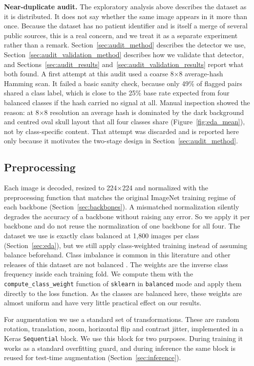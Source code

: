 \documentclass[11pt]{article}
\begin{document}
\textbf{Near-duplicate audit.} The exploratory analysis above describes the dataset as it is distributed. It does not say whether the same image appears in it more than once. Because the dataset has no patient identifier and is itself a merge of several public sources, this is a real concern, and we treat it as a separate experiment rather than a remark. Section~\ref{sec:audit_method} describes the detector we use, Section~\ref{sec:audit_validation_method} describes how we validate that detector, and Sections~\ref{sec:audit_results} and~\ref{sec:audit_validation_results} report what both found. A first attempt at this audit used a coarse 8$\times$8 average-hash Hamming scan. It failed a basic sanity check, because only 49\% of flagged pairs shared a class label, which is close to the 25\% base rate expected from four balanced classes if the hash carried no signal at all. Manual inspection showed the reason: at 8$\times$8 resolution an average hash is dominated by the dark background and centred oval skull layout that all four classes share (Figure~\ref{fig:eda_mean}), not by class-specific content. That attempt was discarded and is reported here only because it motivates the two-stage design in Section~\ref{sec:audit_method}.

\subsection{Preprocessing}
\label{sec:preprocessing}
Each image is decoded, resized to 224$\times$224 and normalized with the preprocessing function that matches the original ImageNet training regime of each backbone (Section~\ref{sec:backbones}). A mismatched normalization silently degrades the accuracy of a backbone without raising any error. So we apply it per backbone and do not reuse the normalization of one backbone for all four. The dataset we use is exactly class balanced at 1,800 images per class (Section~\ref{sec:eda}), but we still apply class-weighted training instead of assuming balance beforehand. Class imbalance is common in this literature and other releases of this dataset are not balanced \cite{buda2018imbalance}. The weights are the inverse class frequency inside each training fold. We compute them with the \texttt{compute\_class\_weight} function of \texttt{sklearn} in \texttt{balanced} mode and apply them directly to the loss function. As the classes are balanced here, these weights are almost uniform and have very little practical effect on our results.

For augmentation we use a standard set of transformations. These are random rotation, translation, zoom, horizontal flip and contrast jitter, implemented in a Keras \texttt{Sequential} block. We use this block for two purposes. During training it works as a standard overfitting guard, and during inference the same block is reused for test-time augmentation (Section~\ref{sec:inference}).
\end{document}
